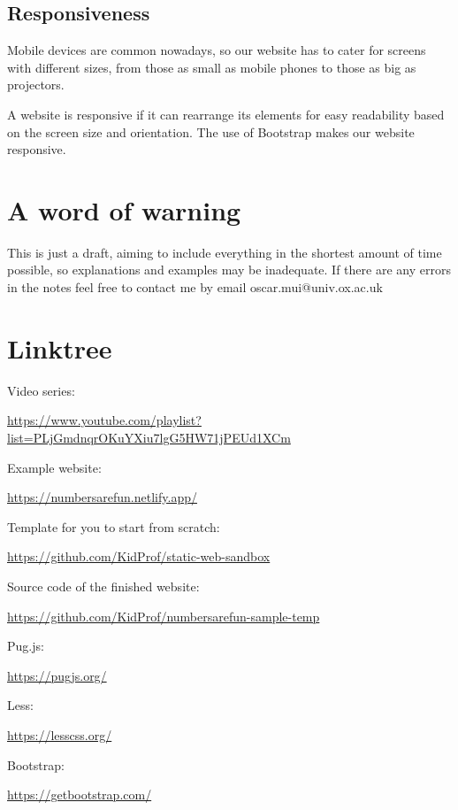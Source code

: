 \subsection*{Responsiveness}

Mobile devices are common nowadays, so our website has to cater for screens with different sizes, from those as small as mobile phones to those as big as projectors. 

A website is responsive if it can rearrange its elements for easy readability based on the screen size and orientation. The use of Bootstrap makes our website responsive.

\section{A word of warning}

This is just a draft, aiming to include everything in the shortest amount of time possible, so explanations and examples may be inadequate. If there are any errors in the notes feel free to contact me by email oscar.mui@univ.ox.ac.uk

\section{Linktree}

Video series:

\href{https://www.youtube.com/playlist?list=PLjGmdnqrOKuYXiu7lgG5HW71jPEUd1XCm}{https://www.youtube.com/playlist?list=PLjGmdnqrOKuYXiu7lgG5HW71jPEUd1XCm}
\vspace{0mm} %

Example website:

\href{https://numbersarefun.netlify.app/}{https://numbersarefun.netlify.app/}
\vspace{6mm}

Template for you to start from scratch:

\href{https://github.com/KidProf/static-web-sandbox}{https://github.com/KidProf/static-web-sandbox}
\vspace{6mm}

Source code of the finished website:

\href{https://github.com/KidProf/numbersarefun-sample-temp}{https://github.com/KidProf/numbersarefun-sample-temp}
\vspace{6mm}

Pug.js: 

\href{https://pugjs.org/}{https://pugjs.org/}
\vspace{6mm}

Less: 

\href{https://lesscss.org/}{https://lesscss.org/}
\vspace{6mm}

Bootstrap: 

\href{https://getbootstrap.com/}{https://getbootstrap.com/}
\vspace{6mm}

